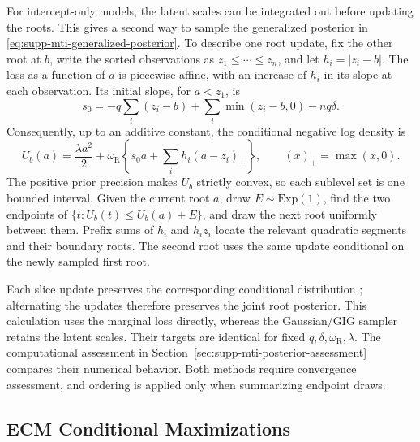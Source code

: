 \documentclass[11pt]{article}
\begin{document}
For intercept-only models, the latent scales can be integrated out before
updating the roots. This gives a second way to sample the generalized
posterior in \eqref{eq:supp-mti-generalized-posterior}. To describe one root update, fix
the other root at \(b\), write the sorted observations as
\(z_1\le\cdots\le z_n\), and let \(h_i=|z_i-b|\). The loss as a function
of \(a\) is piecewise affine, with an increase of \(h_i\) in its slope at
each observation. Its initial slope, for \(a<z_1\), is
\[
s_0=-q\sum_i(z_i-b)+\sum_i\min(z_i-b,0)-nq\delta.
\]
Consequently, up to an additive constant, the conditional negative log
density is
\[
U_b(a)=\frac{\lambda a^2}{2}
+\omega_{\mathrm R}\left\{s_0a+\sum_i h_i(a-z_i)_+\right\},
\qquad (x)_+=\max(x,0).
\]
The positive prior precision makes \(U_b\) strictly convex, so each sublevel
set is one bounded interval. Given the current root \(a\), draw
\(E\sim\mathrm{Exp}(1)\), find the two endpoints of
\(\{t:U_b(t)\le U_b(a)+E\}\), and draw the next root uniformly between
them. Prefix sums of \(h_i\) and \(h_iz_i\) locate the relevant quadratic
segments and their boundary roots. The second root uses the same update
conditional on the newly sampled first root.

Each slice update preserves the corresponding conditional distribution
\citep{Neal2003SliceSampling}; alternating the updates therefore preserves
the joint root posterior. This calculation uses the marginal loss directly,
whereas the Gaussian/GIG sampler retains the latent scales. Their targets
are identical for fixed \(q,\delta,\omega_{\mathrm R},\lambda\).
The computational assessment in
Section~\ref{sec:supp-mti-posterior-assessment} compares their numerical
behavior. Both methods require convergence assessment, and ordering is
applied only when summarizing endpoint draws.

\subsection{ECM Conditional Maximizations}
\end{document}
